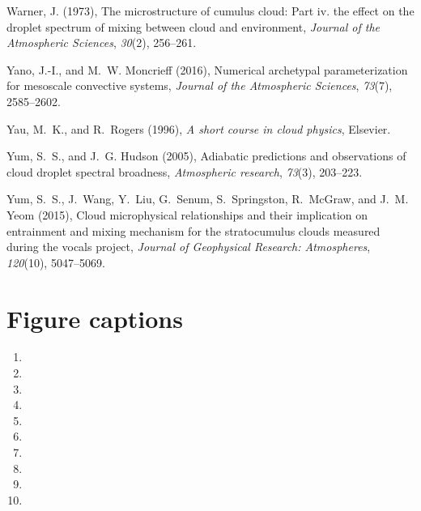 \documentclass[draft,linenumbers]{agujournal}
\begin{document}
\begin{thebibliography}{60}
Warner, J. (1973), The microstructure of cumulus cloud: Part iv. the effect on
  the droplet spectrum of mixing between cloud and environment, \textit{Journal
  of the Atmospheric Sciences}, \textit{30}(2), 256--261.

Yano, J.-I., and M.~W. Moncrieff (2016), Numerical archetypal parameterization
  for mesoscale convective systems, \textit{Journal of the Atmospheric
  Sciences}, \textit{73}(7), 2585--2602.

Yau, M.~K., and R.~Rogers (1996), \textit{A short course in cloud physics},
  Elsevier.

Yum, S.~S., and J.~G. Hudson (2005), Adiabatic predictions and observations of
  cloud droplet spectral broadness, \textit{Atmospheric research},
  \textit{73}(3), 203--223.

Yum, S.~S., J.~Wang, Y.~Liu, G.~Senum, S.~Springston, R.~McGraw, and J.~M. Yeom
  (2015), Cloud microphysical relationships and their implication on
  entrainment and mixing mechanism for the stratocumulus clouds measured during
  the vocals project, \textit{Journal of Geophysical Research: Atmospheres},
  \textit{120}(10), 5047--5069.
  
\end{thebibliography}

\newpage
\section*{Figure captions}
\begin{enumerate}[label=Figure \arabic*:\,, leftmargin=0cm,itemindent=.5cm,labelwidth=\itemindent,labelsep=0cm,align=left]
\item {}

\item {}

\item {}

\item {}

\item {}

\item {}

\item {}

\item {}

\item {}

\item {}


\end{enumerate}
\end{document}
